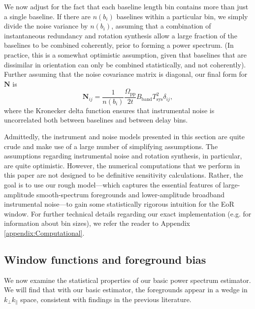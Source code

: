 \documentclass[twocolumn,aps,prd,nofootinbib,showpacs]{revtex4-1}
\begin{document}
We now adjust for the fact that each baseline length bin contains more than just a single baseline.  If there are $n(b_i)$ baselines within a particular bin, we simply divide the noise variance by $n(b_i)$, assuming that a combination of instantaneous redundancy and rotation synthesis allow a large fraction of the baselines to be combined coherently, prior to forming a power spectrum.  (In practice, this is a somewhat optimistic assumption, given that baselines that are dissimilar in orientation can only be combined statistically, and not coherently).  Further assuming that the noise covariance matrix is diagonal, our final form for $\mathbf{N}$ is
\begin{equation}
\mathbf{N}_{ij} =\frac{1}{n(b_i)} \frac{\Omega_{\textrm{pp}}}{2t}  B_\textrm{band} T_\textrm{sys}^2 \delta_{ij},
\end{equation}
where the Kronecker delta function ensures that instrumental noise is uncorrelated both between baselines and between delay bins.

Admittedly, the instrument and noise models presented in this section are quite crude and make use of a large number of simplifying assumptions.  The assumptions regarding instrumental noise and rotation synthesis, in particular, are quite optimistic.  However, the numerical computations that we perform in this paper are not designed to be definitive sensitivity calculations.  Rather, the goal is to use our rough model---which captures the essential features of large-amplitude smooth-spectrum foregrounds and lower-amplitude broadband instrumental noise---to gain some statistically rigorous intuition for the EoR window.  For further technical details regarding our exact implementation (e.g. for information about bin sizes), we refer the reader to Appendix \ref{appendix:Computational}.

\subsection{Window functions and foreground bias}

We now examine the statistical properties of our basic power spectrum estimator.  We will find that with our basic estimator, the foregrounds appear in a wedge in $k_\perp k_\parallel$ space, consistent with findings in the previous literature.
\end{document}
